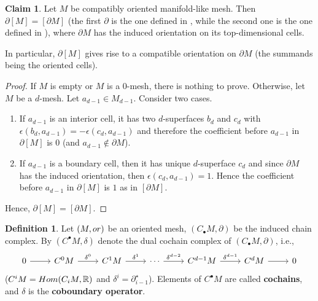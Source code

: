 \documentclass{elsarticle}
\theoremstyle{definition}
\newtheorem{claim}[theorem]{Claim}
\newtheorem{definition}[theorem]{Definition}
\newcommand{\R}{\mathbb{R}} %
\newcommand{\Hom}{\mathop{\rm Hom}\nolimits}
\newcommand{\OR}{\mathop{\rm or}\nolimits}   %
\begin{document}
\begin{claim}
\label{thm:fundamental_class_boundary}
  Let $M$ be compatibly oriented manifold-like mesh. Then $\partial [M] = [\partial M]$ (the first $\partial$ is the one defined in , while the second one is the one defined in ), where $\partial M$ has the induced orientation on its top-dimensional cells.
  
  In particular, $\partial [M]$ gives rise to a compatible orientation on $\partial M$ (the summands being the oriented cells). 
\end{claim}
\begin{proof}
  If $M$ is empty or $M$ is a $0$-mesh, there is nothing to prove. Otherwise, let $M$ be a $d$-mesh. Let $a_{d - 1} \in M_{d - 1}$. Consider two cases. 
  \begin{enumerate}
    \item
      If $a_{d -1}$ is an interior cell, it has two $d$-superfaces $b_d$ and $c_d$ with $\epsilon(b_d, a_{d - 1}) = - \epsilon(c_d, a_{d - 1})$ and therefore the coefficient before $a_{d -1}$ in $\partial [M]$ is $0$ (and $a_{d - 1} \notin \partial M$).
    \item
      If $a_{d - 1}$ is a boundary cell, then it has unique $d$-superface $c_d$ and since $\partial M$  has the induced orientation, then $\epsilon(c_d, a_{d - 1}) = 1$. Hence the coefficient before $a_{d - 1}$ in $\partial [M]$ is $1$ as in $[\partial M]$.
  \end{enumerate}
  Hence, $\partial [M] = [\partial M]$.
\end{proof}
\begin{definition}
\label{thm:mesh_cochain_complex}
  Let $(M, \OR)$ be an oriented mesh, $(C_{\bullet} M, \partial)$ be the induced chain complex. By $(C^{\bullet} M, \delta)$ denote the dual cochain complex of $(C_{\bullet} M, \partial)$, i.e.,
  \begin{equation}
    \begin{tikzcd}
      0 \arrow[r, ""] &
      C^0 M \arrow[r, "\delta^0"] &
      C^1 M \arrow[r, "\delta^1"] &
      \cdots \arrow[r, "\delta^{d - 2}"] &
      C^{d - 1} M \arrow[r, "\delta^{d - 1}"] &
      C^d M \arrow[r, ""] &
      0
    \end{tikzcd}
  \end{equation}
  ($C^i M = \Hom(C_i M, \R)$ and $\delta^i = \partial_{i - 1}^\star$).
  Elements of $C^\bullet M$ are called \textbf{cochains}, and $\delta$ is the \textbf{coboundary operator}.
\end{definition}
\end{document}
